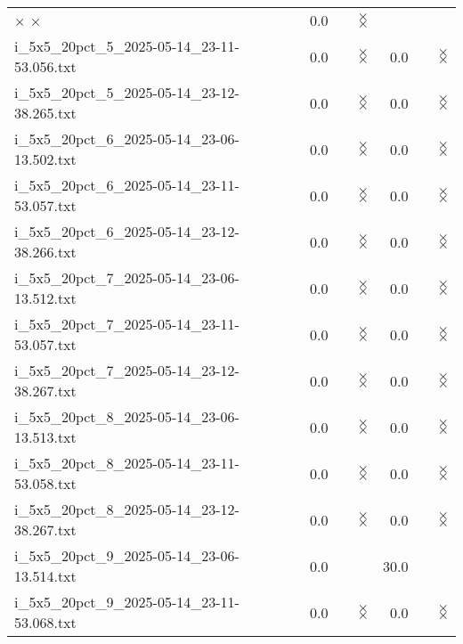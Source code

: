 \documentclass{article}
\begin{document}
\begin{center}
\begin{tabular}{lrrrr}
$\times$
$\times$
 & 0.0 & 
$\times$
$\times$
\\
i\_5x5\_20pct\_5\_2025-05-14\_23-11-53.056.txt & 0.0 & 
$\times$
$\times$
 & 0.0 & 
$\times$
$\times$
\\
i\_5x5\_20pct\_5\_2025-05-14\_23-12-38.265.txt & 0.0 & 
$\times$
$\times$
 & 0.0 & 
$\times$
$\times$
\\
i\_5x5\_20pct\_6\_2025-05-14\_23-06-13.502.txt & 0.0 & 
$\times$
$\times$
 & 0.0 & 
$\times$
$\times$
\\
i\_5x5\_20pct\_6\_2025-05-14\_23-11-53.057.txt & 0.0 & 
$\times$
$\times$
 & 0.0 & 
$\times$
$\times$
\\
i\_5x5\_20pct\_6\_2025-05-14\_23-12-38.266.txt & 0.0 & 
$\times$
$\times$
 & 0.0 & 
$\times$
$\times$
\\
i\_5x5\_20pct\_7\_2025-05-14\_23-06-13.512.txt & 0.0 & 
$\times$
$\times$
 & 0.0 & 
$\times$
$\times$
\\
i\_5x5\_20pct\_7\_2025-05-14\_23-11-53.057.txt & 0.0 & 
$\times$
$\times$
 & 0.0 & 
$\times$
$\times$
\\
i\_5x5\_20pct\_7\_2025-05-14\_23-12-38.267.txt & 0.0 & 
$\times$
$\times$
 & 0.0 & 
$\times$
$\times$
\\
i\_5x5\_20pct\_8\_2025-05-14\_23-06-13.513.txt & 0.0 & 
$\times$
$\times$
 & 0.0 & 
$\times$
$\times$
\\
i\_5x5\_20pct\_8\_2025-05-14\_23-11-53.058.txt & 0.0 & 
$\times$
$\times$
 & 0.0 & 
$\times$
$\times$
\\
i\_5x5\_20pct\_8\_2025-05-14\_23-12-38.267.txt & 0.0 & 
$\times$
$\times$
 & 0.0 & 
$\times$
$\times$
\\
i\_5x5\_20pct\_9\_2025-05-14\_23-06-13.514.txt & 0.0 & 
 & 30.0 & 
\\
i\_5x5\_20pct\_9\_2025-05-14\_23-11-53.068.txt & 0.0 & 
$\times$
$\times$
 & 0.0 & 
$\times$
$\times$
\\
\hline\end{tabular}
\end{center}
\end{document}
